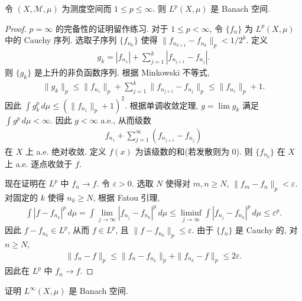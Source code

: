 \documentclass[../../main.tex]{subfiles}
\begin{document}
\begin{theorem}\label{theorem:ch19-riesz-fischer}
令 $(X,\mathcal{M},\mu)$ 为测度空间而 $1\leqslant p\leqslant\infty$. 则 $L^{p}(X,\mu)$ 是 Banach 空间.
\end{theorem}

\begin{proof}
$p=\infty$ 的完备性的证明留作练习. 对于 $1\leqslant p<\infty$, 令 $\{f_{n}\}$ 为 $L^{p}(X,\mu)$ 中的 Cauchy 序列. 选取子序列 $\{f_{n_{k}}\}$ 使得 $\|f_{n_{k+1}}-f_{n_{k}}\|_{p}<1/2^{k}$. 定义
\begin{align*}
g_{k}=|f_{n_{1}}|+\sum_{j=1}^{k}|f_{n_{j+1}}-f_{n_{j}}|.
\end{align*}
则 $\{g_{k}\}$ 是上升的非负函数序列. 根据 Minkowski 不等式,
\begin{align*}
\|g_{k}\|_{p}\leqslant\|f_{n_{1}}\|_{p}+\sum_{j=1}^{k}\|f_{n_{j+1}}-f_{n_{j}}\|_{p}\leqslant\|f_{n_{1}}\|_{p}+1.
\end{align*}
因此 $\int g_{k}^{p}\,d\mu\leqslant(\|f_{n_{1}}\|_{p}+1)^{2}$. 根据单调收敛定理, $g=\lim g_{k}$ 满足 $\int g^{p}\,d\mu<\infty$. 因此 $g<\infty$ a.e., 从而级数
\begin{align*}
f_{n_{1}}+\sum_{j=1}^{\infty}(f_{n_{j+1}}-f_{n_{j}})
\end{align*}
在 $X$ 上 a.e. 绝对收敛. 定义 $f(x)$ 为该级数的和(若发散则为 $0$). 则 $\{f_{n_{k}}\}$ 在 $X$ 上 a.e. 逐点收敛于 $f$.

现在证明在 $L^{p}$ 中 $f_{n}\to f$. 令 $\varepsilon>0$. 选取 $N$ 使得对 $m,n\geqslant N$, $\|f_{m}-f_{n}\|_{p}<\varepsilon$. 对固定的 $k$ 使得 $n_{k}\geqslant N$, 根据 Fatou 引理,
\begin{align*}
\int|f-f_{n_{k}}|^{p}\,d\mu=\int\lim_{j\to\infty}|f_{n_{j}}-f_{n_{k}}|^{p}\,d\mu\leqslant\liminf_{j\to\infty}\int|f_{n_{j}}-f_{n_{k}}|^{p}\,d\mu\leqslant\varepsilon^{p}.
\end{align*}
因此 $f-f_{n_{k}}\in L^{p}$, 从而 $f\in L^{p}$, 且 $\|f-f_{n_{k}}\|_{p}\leqslant\varepsilon$. 由于 $\{f_{n}\}$ 是 Cauchy 的, 对 $n\geqslant N$,
\begin{align*}
\|f_{n}-f\|_{p}\leqslant\|f_{n}-f_{n_{k}}\|_{p}+\|f_{n_{k}}-f\|_{p}\leqslant 2\varepsilon.
\end{align*}
因此在 $L^{p}$ 中 $f_{n}\to f$.
\end{proof}

\begin{exercise}\label{exercise:ch19-01}
证明 $L^{\infty}(X,\mu)$ 是 Banach 空间.
\end{exercise}
\end{document}
